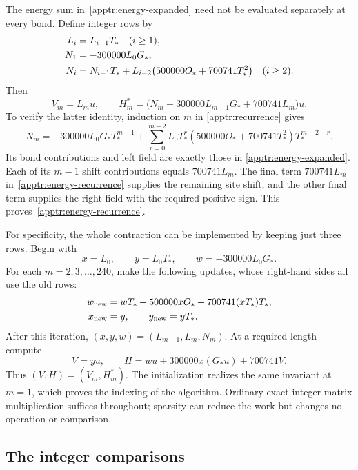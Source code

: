 The energy sum in~\eqref{apptr:energy-expanded} need not be evaluated
separately at every bond.  Define integer rows by
\begin{align}
 L_i&=L_{i-1}T_*\quad(i\ge1),\notag\\
 N_1&=-300000L_0G_*,\notag\\
 N_i&=N_{i-1}T_*+
       L_{i-2}\bigl(500000O_*+700741T_*^2\bigr)
       \quad(i\ge2).
 \label{apptr:recurrence}
\end{align}
Then
\begin{equation}\label{apptr:energy-recurrence}
 V_m=L_mu,\qquad
 H_m^*=\bigl(N_m+300000L_{m-1}G_*+700741L_m\bigr)u.
\end{equation}
To verify the latter identity, induction on $m$ in
\eqref{apptr:recurrence} gives
\begin{equation}\label{apptr:N-expansion}
 N_m=-300000L_0G_*T_*^{m-1}
   +\sum_{r=0}^{m-2}
      L_0T_*^r(500000O_*+700741T_*^2)T_*^{m-2-r}.
\end{equation}
Its bond contributions and left field are exactly those in
\eqref{apptr:energy-expanded}.  Each of its $m-1$ shift
contributions equals $700741L_m$.  The final term $700741L_m$
in~\eqref{apptr:energy-recurrence} supplies the remaining site shift,
and the other final term supplies the right field with the required
positive sign.  This proves~\eqref{apptr:energy-recurrence}.

For specificity, the whole contraction can be implemented by keeping
just three rows.  Begin with
\[
 x=L_0,\qquad y=L_0T_*,\qquad w=-300000L_0G_*.
\]
For each $m=2,3,\ldots,240$, make the following updates, whose
right-hand sides all use the old rows:
\begin{align}
 w_{\mathrm{new}}&=wT_*+500000xO_*+700741(xT_*)T_*,\notag\\
 x_{\mathrm{new}}&=y,\qquad y_{\mathrm{new}}=yT_*.
 \label{apptr:algorithm}
\end{align}
After this iteration, $(x,y,w)=(L_{m-1},L_m,N_m)$.
At a required length compute
\begin{equation}\label{apptr:readout}
 V=yu,\qquad H=wu+300000x(G_*u)+700741V.
\end{equation}
Thus $(V,H)=(V_m,H_m^*)$.  The initialization realizes the same
invariant at $m=1$, which proves the indexing of the algorithm.
Ordinary exact integer matrix multiplication suffices throughout;
sparsity can reduce the work but changes no operation or comparison.

\subsection{The integer comparisons}

